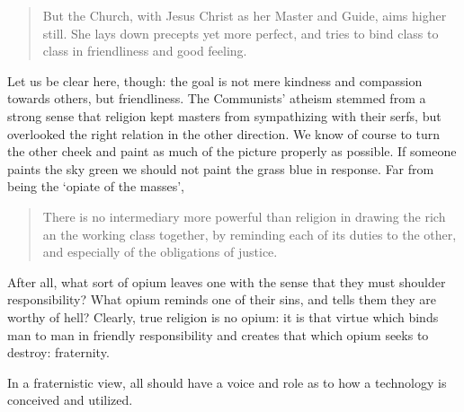 \documentclass[letterpaper]{article}
\begin{document}
\begin{quote}
  But the Church, with Jesus Christ as her Master and Guide, aims higher still. She lays down precepts yet more perfect, and tries to bind class to class in friendliness and good feeling.
\end{quote}

Let us be clear here, though: the goal is not mere kindness and compassion towards others, but friendliness. The Communists' atheism stemmed from a strong sense that religion kept masters from sympathizing with their serfs, but overlooked the right relation in the other direction. We know of course to turn the other cheek and paint as much of the picture properly as possible. If someone paints the sky green we should not paint the grass blue in response. Far from being the `opiate of the masses',

\begin{quote}
  There is no intermediary more powerful than religion in drawing the rich an the working class together, by reminding each of its duties to the other, and especially of the obligations of justice.
\end{quote}

After all, what sort of opium leaves one with the sense that they must shoulder responsibility? What opium reminds one of their sins, and tells them they are worthy of hell? Clearly, true religion is no opium: it is that virtue which binds man to man in friendly responsibility and creates that which opium seeks to destroy: fraternity.

In a fraternistic view, all should have a voice and role as to how a technology is conceived and utilized.
\end{document}
